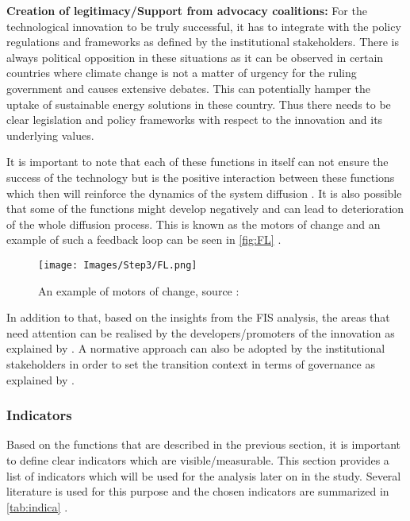 \textbf{Creation of legitimacy/Support from advocacy coalitions:} For the technological innovation to be truly successful, it has to integrate with the policy regulations and frameworks as defined by the institutional stakeholders. There is always political opposition in these situations as it can be observed in certain countries where climate change is not a matter of urgency for the ruling government and causes extensive debates. This can potentially hamper the uptake of sustainable energy solutions in these country. Thus there needs to be clear legislation and policy frameworks with respect to the innovation and its underlying values.


It is important to note that each of these functions in itself can not ensure the success of the technology but is the positive interaction between these functions which then will reinforce the dynamics of the system diffusion \citep{FIS2009}. It is also possible that some of the functions might develop negatively and can lead to deterioration of the whole diffusion process. This is known as the motors of change and an example of such a feedback loop can be seen in \autoref{fig:FL} \citep{hekkert_suurs_negro_kuhlmann_smits_2007}. 
\begin{figure}[H]
    \centering
    \texttt{[image: Images/Step3/FL.png]}
    \caption{An example of motors of change, source : \citep{hekkert_suurs_negro_kuhlmann_smits_2007}}
    \label{fig:FL}
\end{figure}
In addition to that, based on the insights from the FIS analysis, the areas that need attention can be realised by the developers/promoters of the innovation as explained by \cite{alphen_hekkert_sark_2008}. A normative approach can also be adopted by the institutional stakeholders in order to set the transition context in terms of governance as explained by \cite{RePEc:eee:respol:v:34:y:2005:i:10:p:1491-1510}. 

\subsubsection{ Indicators}
\label{sec:Indicators}
Based on the functions that are described in the previous section, it is important to define clear indicators which are visible/measurable. This section provides a list of indicators which will be used for the analysis later on in the study.  Several literature is used for this purpose and the chosen indicators are summarized in \autoref{tab:indica} \citep{hekkert_suurs_negro_kuhlmann_smits_2007} \citep{Kamp2008} \citep{FIS2009}.

